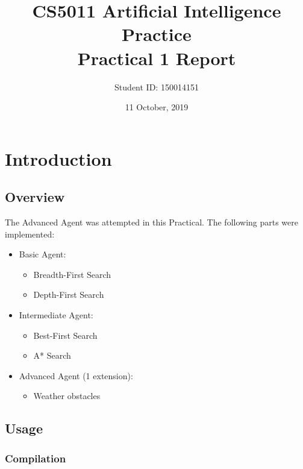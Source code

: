 \documentclass[letterpaper,12pt]{article}
\begin{document}
\title{CS5011 Artificial Intelligence Practice\\Practical 1 Report}
\author{Student ID: 150014151}
\date{11 October, 2019}
\maketitle



\section{Introduction}
\label{sec:introduction}

\subsection{Overview}

The Advanced Agent was attempted in this Practical. The following parts were implemented:
\begin{itemize}
    \item Basic Agent:
    \begin{itemize}
       \item Breadth-First Search
        \item Depth-First Search
    \end{itemize}
    \item Intermediate Agent:
    \begin{itemize}
        \item Best-First Search
        \item A* Search
    \end{itemize}
    \item Advanced Agent (1 extension):
    \begin{itemize}
        \item Weather obstacles
    \end{itemize}
\end{itemize}

\subsection{Usage}

\subsubsection{Compilation}
\end{document}
